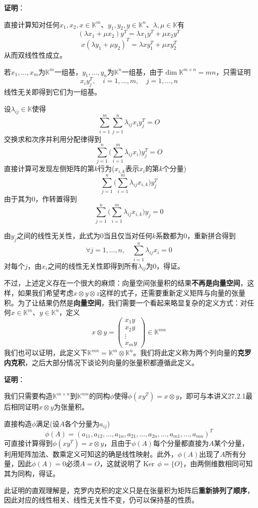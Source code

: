 \documentclass[a4paper,UTF8,fontset=windows,AutoFakeBold]{ctexart}
\DeclareMathOperator{\Ker}{Ker\,}
\newcommand*{\note}{\noindent *}
\newcommand{\proo}[1]{{\vspace{5pt}\kaishu\noindent\textbf{证明}：\vspace{-3pt}
\begin{compactitem}
    \item[] #1
\end{compactitem}
}}
\begin{document}
\proo{
    直接计算知对任何$x_1,x_2,x\in\mathbb{K}^m$、$y_1,y_2,y\in\mathbb{K}^n$、$\lambda,\mu\in\mathbb{K}$有
    $$(\lambda x_1+\mu x_2)y^T=\lambda x_1y^T+\mu x_2y^T$$
    $$x(\lambda y_1+\mu y_2)^T=\lambda xy_1^T+\mu xy_2^T$$
    从而双线性性成立。

    若$x_1,\dots,x_m$为$\mathbb{K}^m$一组基，$y_1,\dots,y_n$为$\mathbb{K}^n$一组基，由于$\dim\mathbb{K}^{m\times n}=mn$，只需证明
    $$x_iy_j^T,\quad i=1,\dots,m,\quad j=1,\dots,n$$
    线性无关即得到它们为一组基。

    设$\lambda_{ij}\in\mathbb{K}$使得
    $$\sum_{i=1}^m\sum_{j=1}^n\lambda_{ij}x_iy_j^T=O$$
    交换求和次序并利用分配律得到
    $$\sum_{j=1}^n\bigg(\sum_{i=1}^m\lambda_{ij}x_i\bigg)y_j^T=O$$
    直接计算可发现左侧矩阵的第$k$行为($x_{i,k}$表示$x_i$的第$k$个分量)
    $$\sum_{j=1}^n\bigg(\sum_{i=1}^m\lambda_{ij}x_{i,k}\bigg)y_j^T$$
    由于其为0，作转置得到
    $$\sum_{j=1}^n\bigg(\sum_{i=1}^m\lambda_{ij}x_{i,k}\bigg)y_j=0$$

    由$y_j$之间的线性无关性，此式为0当且仅当对任何$k$系数都为0，重新拼合得到
    $$\forall j=1,\dots,n,\quad\sum_{i=1}^n\lambda_{ij}x_i=0$$
    对每个$j$，由$x_i$之间的线性无关性即得到所有$\lambda_{ij}$为0，得证。
}

不过，上述定义存在一个很大的麻烦：向量空间张量积的结果\textbf{不再是向量空间}，这样，如果我们希望考虑$x\otimes y\otimes z$这样的式子，还需要重新定义矩阵与向量的张量积。为了让结果仍然是\textbf{向量空间}，我们需要一个看起来略显复杂的定义方式：对任何$x\in\mathbb{K}^m$、$y\in\mathbb{K}^n$，定义
$$x\otimes y=\begin{pmatrix}x_1y\\x_2y\\\vdots\\x_my\end{pmatrix}\in\mathbb{K}^{mn}$$
我们也可以证明，此定义下$\mathbb{K}^{mn}=\mathbb{K}^m\otimes\mathbb{K}^n$。我们将此定义称为两个列向量的\textbf{克罗内克积}，之后大部分情况下谈论列向量的张量积都遵循此定义。

\proo{
    我们只需要构造$\mathbb{K}^{m\times n}$到$\mathbb{K}^{mn}$的同构$\phi$使得$\phi(xy^T)=x\otimes y$，即可与本讲义27.2.1最后相同证明$x\otimes y$为张量积。

    直接构造$\phi$满足(设$A$各个分量为$a_{ij}$)
    $$\phi(A)=(a_{11},a_{12},\dots,a_{1n},a_{21},\dots,a_{2n},\dots,a_{m1},\dots,a_{mn})^T$$
    可直接计算得到$\phi(xy^T)=x\otimes y$，且由于$\phi(A)$每个分量都直接为$A$某个分量，利用矩阵加法、数乘定义可知这的确是线性映射。此外，$\phi(A)$出现了$A$所有分量，因此$\phi(A)=0$必须$A=O$，这就说明了$\Ker\phi=\{O\}$，由两侧维数相同可知其为同构，得证。

    \note 此证明的直观理解是，克罗内克积的定义只是在张量积为矩阵后\textbf{重新排列了顺序}，因此对应的线性相关、线性无关性不变，仍可以保持基的性质。
}
\end{document}
